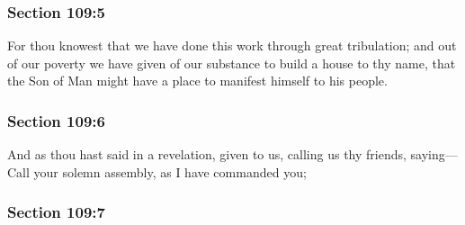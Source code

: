 
	\subsubsection{Section 109:5} %
		\label{DC109-5}

		For thou knowest that we have done this work through great tribulation; and out of our poverty we have given of our substance to build a house to thy name, that the Son of Man might have a place to manifest himself to his people.


	\subsubsection{Section 109:6} %
		\label{DC109-6}

		And as thou hast said in a revelation, given to us, calling us thy friends, saying---Call your solemn assembly, as I have commanded you;


	\subsubsection{Section 109:7} %
		\label{DC109-7}

